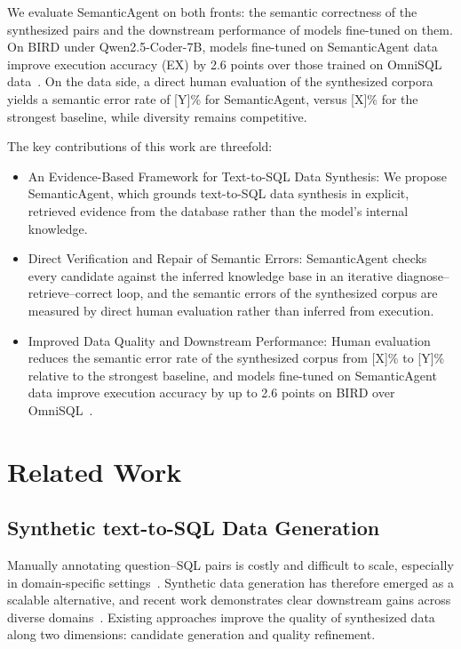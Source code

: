 \documentclass[letterpaper,journal]{IEEEtran}
\begin{document}
We evaluate SemanticAgent on both fronts: the semantic correctness of the synthesized pairs and the downstream performance of models fine-tuned on them. On BIRD under Qwen2.5-Coder-7B, models fine-tuned on SemanticAgent data improve execution accuracy (EX) by 2.6 points over those trained on OmniSQL data~\cite{li2025omnisql}. On the data side, a direct human evaluation of the synthesized corpora yields a semantic error rate of [Y]\% for SemanticAgent, versus [X]\% for the strongest baseline, while diversity remains competitive.

The key contributions of this work are threefold:
\begin{itemize}
\item An Evidence-Based Framework for Text-to-SQL Data Synthesis: We propose SemanticAgent, which grounds text-to-SQL data synthesis in explicit, retrieved evidence from the database rather than the model's internal knowledge.
\item Direct Verification and Repair of Semantic Errors: SemanticAgent checks every candidate against the inferred knowledge base in an iterative diagnose--retrieve--correct loop, and the semantic errors of the synthesized corpus are measured by direct human evaluation rather than inferred from execution.
\item Improved Data Quality and Downstream Performance: Human evaluation reduces the semantic error rate of the synthesized corpus from [X]\% to [Y]\% relative to the strongest baseline, and models fine-tuned on SemanticAgent data improve execution accuracy by up to 2.6 points on BIRD over OmniSQL~\cite{li2025omnisql}.
\end{itemize}


\section{Related Work}\label{sec:related}

\subsection{Synthetic text-to-SQL Data Generation}

Manually annotating question--SQL pairs is costly and difficult to scale, especially in domain-specific settings~\cite{zhang2023sciencebenchmark,lee2022ehrsql}. Synthetic data generation has therefore emerged as a scalable alternative, and recent work demonstrates clear downstream gains across diverse domains~\cite{yang2024synthesizing,li2025omnisql}. Existing approaches improve the quality of synthesized data along two dimensions: candidate generation and quality refinement.
\end{document}
